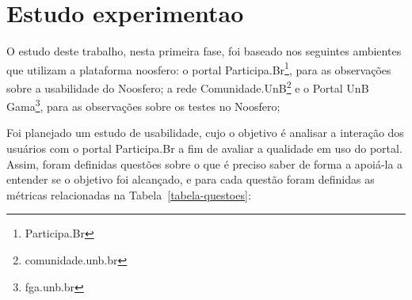 \section{Estudo experimentao}
\label{sec:estudo}

	O estudo deste trabalho, nesta primeira fase, foi baseado nos seguintes ambientes que utilizam a plataforma noosfero:
%
o portal Participa.Br\footnote{Participa.Br}, para as observações sobre a usabilidade do Noosfero;
%
a rede Comunidade.UnB\footnote{comunidade.unb.br} e o Portal UnB Gama\footnote{fga.unb.br}, para as observações sobre os testes no Noosfero;
%

Foi planejado um estudo de usabilidade, cujo o objetivo é analisar a interação dos usuários com o portal Participa.Br a fim de avaliar a qualidade em uso do portal. 
%
Assim, foram definidas questões sobre o que é preciso saber de forma a apoiá-la a entender se o objetivo foi alcançado, e para cada questão foram definidas as métricas relacionadas na Tabela~\ref{tabela-questoes}: 

